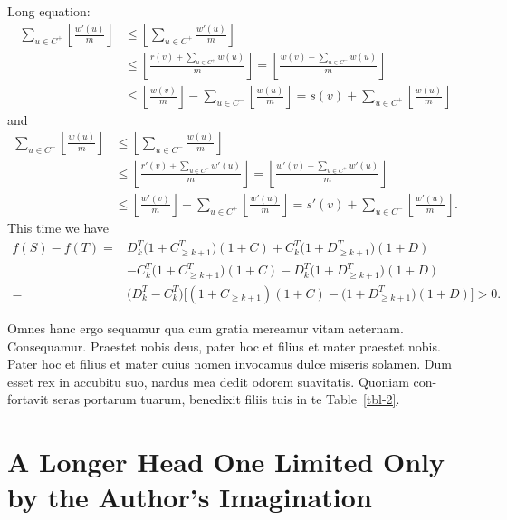 \documentclass{sili}
\begin{document}
Long equation:
%
\begin{align}
\sum_{u\in C^+}\left\lfloor{\frac{w'(u)}{m}} \right\rfloor 
    & \le \left\lfloor\sum_{u\in C^+} {\frac{w'(u)}{m}} \right\rfloor \nonumber \\
    & \le \left\lfloor{\frac{r(v)+\sum_{u\in C^+} w(u)}{m}} \right \rfloor = \left\lfloor{\frac{w(v)-\sum_{u\in C^-} w(u)}{m}} \right \rfloor \nonumber \\
    & \le \left\lfloor{\frac{w(v)}{m}} \right\rfloor -\sum_{u\in C^-}\left\lfloor{\frac{w(u)}{m}} \right\rfloor = s(v)+\sum_{u\in C^+}\left\lfloor{\frac{w(u)}{m}} \right\rfloor
\end{align}
%
and
%
\begin{align}
\sum_{u\in C^-}\left\lfloor{\frac{w(u)}{m}} \right\rfloor
    & \le \left\lfloor\sum_{u\in C^-} {\frac{w(u)}{m}} \right\rfloor \nonumber \\
    & \le \left\lfloor{\frac{r'(v)+\sum_{u\in C^-} w'(u)}{m}} \right \rfloor = \left\lfloor{\frac{w'(v)-\sum_{u\in C^+} w'(u)}{m}} \right\rfloor \nonumber\\
    & \le \left\lfloor{\frac{w'(v)}{m}} \right\rfloor -\sum_{u\in C^+}\left\lfloor{\frac{w'(u)}{m}} \right\rfloor = s'(v)+\sum _{u\in C^-}\left\lfloor{\frac{w'(u)}{m}} \right\rfloor .
\end{align}
%
This time we have
%
\begin{align}
f(S)-f(T) = {} & D_k^T\bigl(1+C_{\geq k+1}^T\bigr)(1 + C) + C_k^T\bigl(1+D_{\geq k+1}^T\bigr)(1 + D) \nonumber    \\
            {} & - C_k^T\bigl(1+C_{\geq k+1}^T\bigr)(1 + C) - D_k^T\bigl (1+D_{\geq k+1}^T\bigr)(1 + D) \nonumber \\
          = {} & \bigl(D_k^T-C_k^T\bigr)\bigl[(1+C_{\geq k+1})(1+C)-\bigl (1+D_{\geq k+1}^T\bigr)(1+D)\bigr]>0.
\end{align}

Omnes hanc ergo sequamur qua cum gratia mereamur vitam aeternam.
Consequamur. Praestet nobis deus, pater hoc et filius et mater
praestet nobis.  Pater hoc et filius et mater cuius nomen invocamus
dulce miseris solamen. Dum esset rex in accubitu suo, nardus mea
dedit odorem suavitatis. Quoniam con-fortavit seras portarum tuarum,
benedixit filiis tuis in te Table~\ref{tbl-2}.



\section{A Longer Head One Limited Only by the Author's Imagination}
\end{document}
